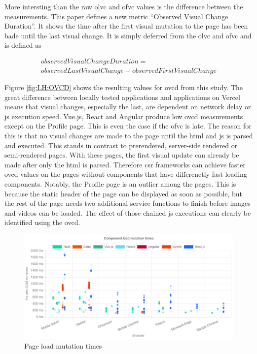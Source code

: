 \documentclass[a4paper, 12pt]{article}
\begin{document}
More intersting than the raw \acrshort{olvc} and \acrshort{ofvc} values is the difference between the measurements.
This paper defines a new metric \enquote{Observed Visual Change Duration}.
It shows the time after the first visual mutation to the page has been bade until the last visual change.
It is simply deferred from the \acrshort{olvc} and \acrshort{ofvc} and is defined as

\begin{multline}
  \mathit{observedVisualChangeDuration} =\\ \mathit{observedLastVisualChange} - \mathit{observedFirstVisualChange}
\end{multline}

Figure \ref{fig:LH:OVCD} shows the resulting values for \acrfull{ovcd} from this study.
The great difference between locally tested applications and applications on Vercel means that visual changes, especially the last, are dependent on network delay or \acrlong{js} execution speed.
Vue.js, React and Angular produce low \acrshort{ovcd} measurements except on the Profile page.
This is even the case if the \acrshort{ofvc} is late.
The reason for this is that no visual changes are made to the page until the \acrshort{html} and \acrshort{js} is parsed and executed.
This stands in contrast to prerendered, server-side rendered or semi-rendered pages.
With these pages, the first visual update can already be made after only the \acrshort{html} is parsed.
Therefore \acrshort{csr} frameworks can achieve faster \acrshort{ovcd} values on the pages without components that have differenctly fast loading components.
Notably, the Profile page is an outlier among the pages.
This is because the static header of the page can be displayed as soon as possible, but the rest of the page needs two additional service functions to finish before images and videos can be loaded.
The effect of those chained \acrlong{js} executions can clearly be identified using the \acrshort{ovcd}.

\begin{figure}[ht!]
  \centering
  \includegraphics[width=\linewidth, keepaspectratio]{img/playwright-results/pageLoadMutations/total.png}
  \caption{Page load mutation times}
  \label{fig:Playwright:pageLoadMutations:total}
\end{figure}
\end{document}
